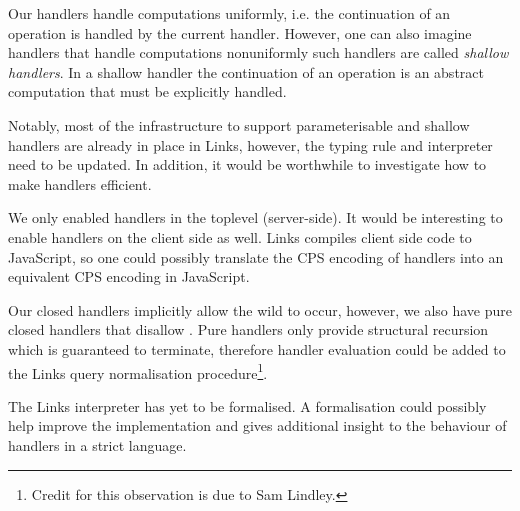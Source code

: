 Our handlers handle computations uniformly, i.e. the continuation of an operation is handled by the current handler. However, one can also imagine handlers that handle computations nonuniformly such handlers are called \emph{shallow handlers}. In a shallow handler the continuation of an operation is an abstract computation that must be explicitly handled.

Notably, most of the infrastructure to support parameterisable and shallow handlers are already in place in Links, however, the typing rule and interpreter need to be updated. In addition, it would be worthwhile to investigate how to make handlers efficient.

We only enabled handlers in the toplevel (server-side). It would be interesting to enable handlers on the client side as well. Links compiles client side code to JavaScript, so one could possibly translate the CPS encoding of handlers into an equivalent CPS encoding in JavaScript.

Our closed handlers implicitly allow the wild to occur, however, we also have pure closed handlers that disallow . Pure handlers only provide structural recursion which is guaranteed to terminate, therefore handler evaluation could be added to the Links query normalisation procedure\footnote{Credit for this observation is due to Sam Lindley.}.

The Links interpreter has yet to be formalised. A formalisation could possibly help improve the implementation and gives additional insight to the behaviour of handlers in a strict language.